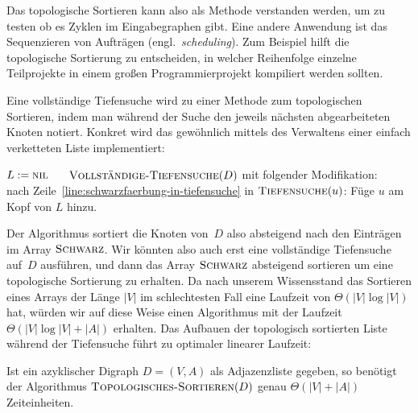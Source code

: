 \begin{bem} 
Das topologische Sortieren kann also als Methode verstanden werden, um zu testen ob es Zyklen im Eingabegraphen gibt.
Eine andere Anwendung ist das Sequenzieren von Aufträgen (engl.~\emph{scheduling}).
Zum Beispiel hilft die topologische Sortierung zu entscheiden, in welcher Reihenfolge einzelne Teilprojekte in einem großen Programmierprojekt kompiliert werden sollten.
\end{bem} 

\begin{bem} 
Eine vollständige Tiefensuche wird zu einer Methode zum topologischen Sortieren, indem man während der Suche den jeweils nächsten abgearbeiteten Knoten notiert.
Konkret wird das gewöhnlich mittels des Verwaltens einer einfach verketteten Liste implementiert:

\begin{algorithm}[H]
\caption{$\cc{Topologisches-Sortieren}(D)$}
 \begin{algorithmic}[1]
  \STATE $L:=\mathop{\text{\textsc{nil}}}$ $\quad$ 
  \STATE $\mathop{\text{\textsc{Vollständige-Tiefensuche}}}(D)$ mit folgender Modifikation:
  \STATE $\qquad$ nach Zeile~\ref{line:schwarzfaerbung-in-tiefensuche} in $\mathop{\text{\textsc{Tiefensuche}}}(u)$: Füge $u$ am Kopf von $L$ hinzu.
 \end{algorithmic}
\end{algorithm}
\end{bem} 

\begin{bem}
Der Algorithmus sortiert die Knoten von~$D$ also absteigend nach den Einträgen im Array $\mathop{\text{\textsc{Schwarz}}}$.
Wir könnten also auch erst eine vollständige Tiefensuche auf~$D$ ausführen, und dann das Array $\mathop{\text{\textsc{Schwarz}}}$ absteigend sortieren um eine topologische Sortierung zu erhalten.
Da nach unserem Wissensstand das Sortieren eines Arrays der Länge $|V|$ im schlechtesten Fall eine Laufzeit von $\Theta(|V|\log|V|)$ hat, würden wir auf diese Weise einen Algorithmus mit der Laufzeit $\Theta(|V|\log|V| + |A|)$ erhalten.
Das Aufbauen der topologisch sortierten Liste während der Tiefensuche führt zu optimaler linearer Laufzeit:
\end{bem} 

\begin{thm}
Ist ein azyklischer Digraph $D=(V,A)$ als Adjazenzliste gegeben, so benötigt der Algorithmus $\cc{Topologisches-Sortieren}(D)$ genau $\Theta(|V|+|A|)$ Zeiteinheiten.
\end{thm}

